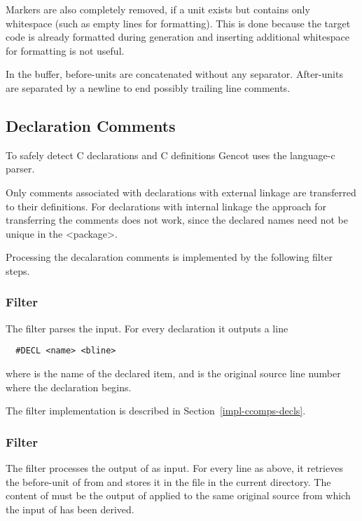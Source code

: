 Markers are also completely removed, if a unit exists but contains only whitespace (such as empty lines for
formatting). This is done because the target code is already formatted during generation and inserting additional
whitespace for formatting is not useful.

In the buffer, before-units are concatenated without any separator. After-units are separated by a newline to end possibly 
trailing line comments.

\subsection{Declaration Comments}
\label{impl-comments-decl}

To safely detect C declarations and C definitions Gencot uses the language-c parser. 

Only comments associated with declarations with external linkage are transferred to their definitions. For declarations
with internal linkage the approach for transferring the comments does not work, since the declared names need not be
unique in the <package>.

Processing the decalaration comments is implemented by the following filter steps. 

\subsubsection{Filter }

The filter  parses the input. For every declaration it outputs a line
\begin{verbatim}
  #DECL <name> <bline>
\end{verbatim}
where  is the name of the declared item, and  is the original source line 
number where the declaration begins.

The filter implementation is described in Section~\ref{impl-ccomps-decls}.

\subsubsection{Filter }

The filter  processes the output of  as input. For every
line as above, it retrieves the before-unit of  from 
and stores it in the file  in the
current directory. The content of  must be the output of  applied to the same
original source from which the input of  has been derived.

